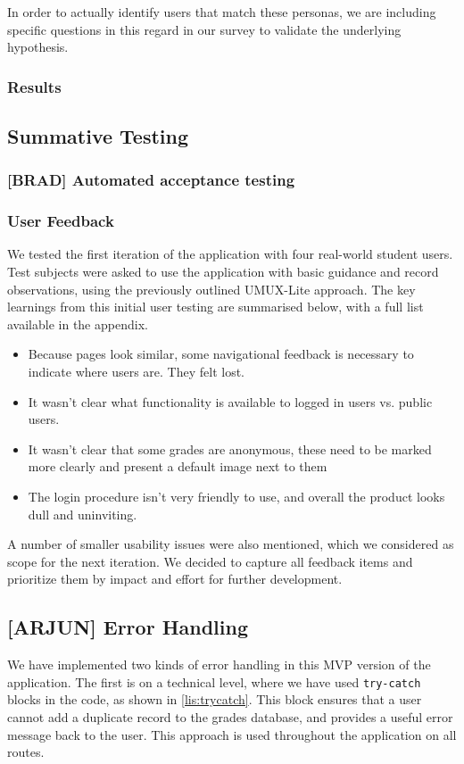 In order to actually identify users that match these personas, we are including specific questions in this regard in our survey to validate the underlying hypothesis.

\subsubsection{Results}

\subsection{Summative Testing}\label{sec:summative}
\subsubsection{[BRAD] Automated acceptance testing}\label{sec:autotest}

\subsubsection{User Feedback}

We tested the first iteration of the application with four real-world student users. Test subjects were asked to use the application with basic guidance and record observations, using the previously outlined UMUX-Lite approach. The key learnings from this initial user testing are summarised below, with a full list available in the appendix.

\begin{itemize}
    \item Because pages look similar, some navigational feedback is necessary to indicate where users are. They felt lost.
    \item It wasn't clear what functionality is available to logged in users vs. public users.
    \item It wasn't clear that some grades are anonymous, these need to be marked more clearly and present a default image next to them
    \item The login procedure isn't very friendly to use, and overall the product looks dull and uninviting.
\end{itemize}

A number of smaller usability issues were also mentioned, which we considered as scope for the next iteration. We decided to capture all feedback items and prioritize them by impact and effort for further development.

\subsection{[ARJUN] Error Handling}
We have implemented two kinds of error handling in this MVP version of the application. The first is on a technical level, where we have used \texttt{try-catch} blocks in the code, as shown in \cref{lis:trycatch}. This block ensures that a user cannot add a duplicate record to the grades database, and provides a useful error message back to the user. This approach is used throughout the application on all routes.

